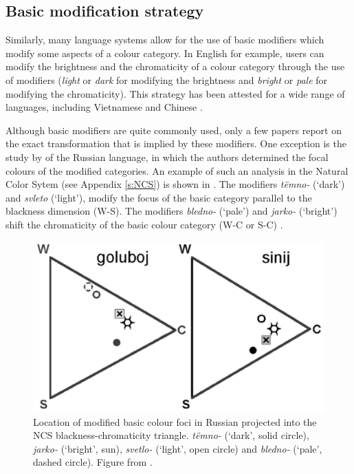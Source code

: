 \subsection{Basic modification strategy}

Similarly, many language systems allow for the use of basic
modifiers which modify some aspects of a colour category. In English
for example, users can modify the brightness and the chromaticity of a
colour category through the use of modifiers (\textit{light} or \textit{dark}
for modifying the brightness and \textit{bright} or \textit{pale} for modifying
the chromaticity). This strategy has been attested for a wide range of
languages, including Vietnamese \citep{alvarado02modifying} and
Chinese \citep{lin01unconstrained}.

Although basic modifiers are quite commonly used, only a few
papers report on the exact transformation that is implied by these
modifiers. One exception is the study by \cite{safuanova07russian} of
the Russian language, in which the authors determined the focal
colours of the modified categories. An example of such an analysis in
the Natural Color Sytem (see Appendix \ref{s:NCS}) is shown in . The modifiers \textit{t\"emno-} (`dark') and
\textit{svleto} (`light'), modify the focus of the basic category parallel to
the blackness dimension (W-S). The modifiers \textit{bledno-} (`pale') and
\textit{jarko-} (`bright') shift the chromaticity of the basic colour
category (W-C or S-C) \citep{safuanova07russian}.

\begin{figure}[htpb]
  \centering
  \includegraphics[width=.5\textwidth]{./intro/figures/russian-diagram.pdf}
  \caption[Location of modified basic colour foci in Russian]{Location
    of modified basic colour foci in Russian projected into the NCS
    blackness-chromaticity triangle. \textit{t\"emno-} (`dark', solid
    circle), \textit{jarko-} (`bright', sun), \textit{svetlo-} (`light', open circle) and  \textit{bledno-} (`pale', dashed circle). Figure
    from \cite{paramei05singing}.}
  \label{f:intro-russian-modifiers}
\end{figure}

